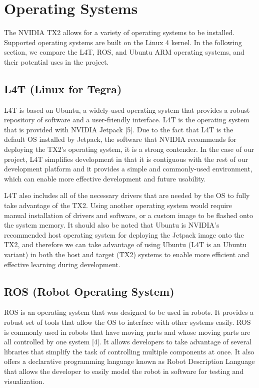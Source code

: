 \documentclass[letterpaper,10pt,serif,draftclsnofoot,onecolumn,compsoc,titlepage]{IEEEtran}
\begin{document}
\newpage
\section{Operating Systems}
The NVIDIA TX2 allows for a variety of operating systems to be installed. Supported operating systems are built on the Linux 4 kernel. In the following section, we compare the L4T, ROS, and Ubuntu ARM operating systems, and their potential uses in the project.

\subsection{L4T (Linux for Tegra)}
L4T is based on Ubuntu, a widely-used operating system that provides a robust repository of software and a user-friendly interface. L4T is the operating system that is provided with NVIDIA Jetpack [5]. Due to the fact that L4T is the default OS installed by Jetpack, the software that NVIDIA recommends for deploying the TX2’s operating system, it is a strong contender. In the case of our project, L4T simplifies development in that it is contiguous with the rest of our development platform and it provides a simple and commonly-used environment, which can enable more effective development and future usability.

L4T also includes all of the necessary drivers that are needed by the OS to fully take advantage of the TX2. Using another operating system would require manual installation of drivers and software, or a custom image to be flashed onto the system memory. It should also be noted that Ubuntu is NVIDIA’s recommended host operating system for deploying the Jetpack image onto the TX2, and therefore we can take advantage of using Ubuntu (L4T is an Ubuntu variant) in both the host and target (TX2) systems to enable more efficient and effective learning during development.

\subsection{ROS (Robot Operating System)}
ROS is an operating system that was designed to be used in robots. It provides a robust set of tools that allow the OS to interface with other systems easily. ROS is commonly used in robots that have moving parts and whose moving parts are all controlled by one system [4]. It allows developers to take advantage of several libraries that simplify the task of controlling multiple components at once. It also offers a declarative programming language known as Robot Description Language that allows the developer to easily model the robot in software for testing and visualization.
\end{document}
